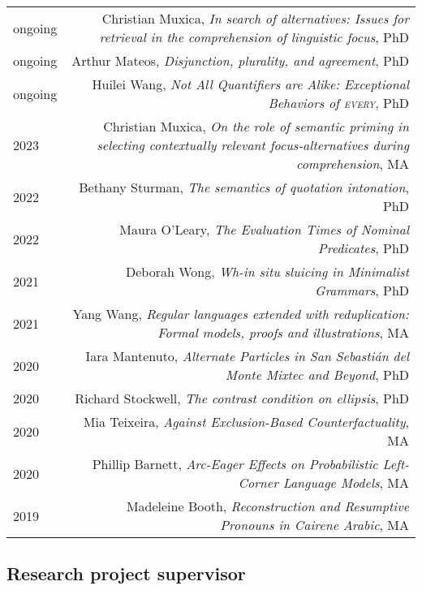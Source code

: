 \documentclass[12pt]{article}
\begin{document}
\begin{longtable}{LR}
  ongoing & Christian Muxica, \textit{In search of alternatives: Issues for
            retrieval in the comprehension of linguistic focus}, PhD\\
  ongoing & Arthur Mateos, \textit{Disjunction, plurality, and agreement}, PhD\\
  ongoing & Huilei Wang, \textit{Not All Quantifiers are Alike: Exceptional
            Behaviors of \textsc{every}}, PhD\\
  2023    & Christian Muxica, \textit{On the role of semantic priming in
            selecting contextually relevant focus-alternatives during
            comprehension}, MA\\
  2022    & Bethany Sturman, \textit{The semantics of quotation intonation},
            PhD\\
  2022    & Maura O'Leary, \textit{The Evaluation Times of Nominal Predicates},
            PhD\\
  2021    & Deborah Wong, \textit{Wh-in situ sluicing in Minimalist Grammars},
            PhD\\
  2021    & Yang Wang, \textit{Regular languages extended with reduplication:
            Formal models, proofs and illustrations}, MA\\
  2020    & Iara Mantenuto, \textit{Alternate Particles in San Sebasti\'{a}n del
            Monte Mixtec and Beyond}, PhD\\
  2020    & Richard Stockwell, \textit{The contrast condition on ellipsis},
            PhD\\
  2020    & Mia Teixeira, \textit{Against Exclusion-Based Counterfactuality},
            MA\\
  2020    & Phillip Barnett, \textit{Arc-Eager Effects on Probabilistic
            Left-Corner Language Models}, MA\\
  2019    & Madeleine Booth, \textit{Reconstruction and Resumptive Pronouns in
            Cairene Arabic}, MA
\end{longtable}

\subsection*{Research project supervisor}
\end{document}
